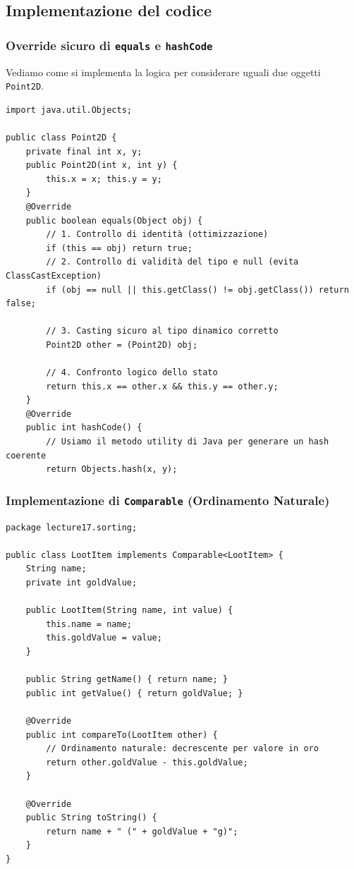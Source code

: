 \documentclass[12pt, a4paper]{article}
\begin{document}
\newpage

\subsection{Implementazione del codice}

\subsubsection{Override sicuro di \texttt{equals} e \texttt{hashCode}}
Vediamo come si implementa la logica per considerare uguali due oggetti \texttt{Point2D}.

\begin{verbatim}
import java.util.Objects;

public class Point2D {
    private final int x, y;
    public Point2D(int x, int y) {
        this.x = x; this.y = y;
    }
    @Override
    public boolean equals(Object obj) {
        // 1. Controllo di identità (ottimizzazione)
        if (this == obj) return true;
        // 2. Controllo di validità del tipo e null (evita ClassCastException)
        if (obj == null || this.getClass() != obj.getClass()) return false;
        
        // 3. Casting sicuro al tipo dinamico corretto
        Point2D other = (Point2D) obj;
        
        // 4. Confronto logico dello stato
        return this.x == other.x && this.y == other.y;
    }
    @Override
    public int hashCode() {
        // Usiamo il metodo utility di Java per generare un hash coerente
        return Objects.hash(x, y);
\end{verbatim}

\newpage

\subsubsection{Implementazione di \texttt{Comparable} (Ordinamento Naturale)}
\begin{verbatim}
package lecture17.sorting;

public class LootItem implements Comparable<LootItem> {
    String name;
    private int goldValue;

    public LootItem(String name, int value) {
        this.name = name;
        this.goldValue = value;
    }

    public String getName() { return name; }
    public int getValue() { return goldValue; }

    @Override
    public int compareTo(LootItem other) {
        // Ordinamento naturale: decrescente per valore in oro
        return other.goldValue - this.goldValue;
    }

    @Override
    public String toString() {
        return name + " (" + goldValue + "g)";
    }
}
\end{verbatim}
\end{document}
